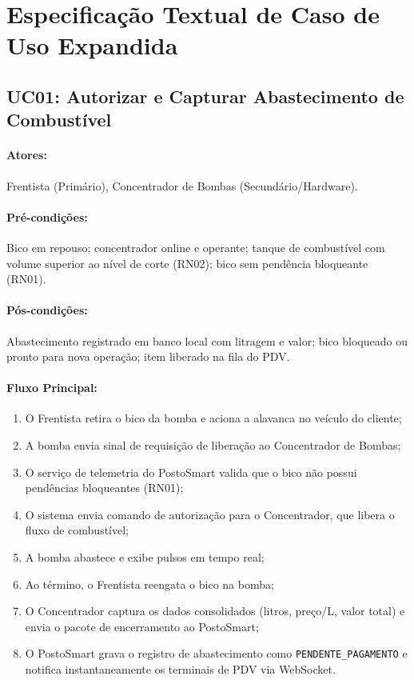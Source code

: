 \section{Especificação Textual de Caso de Uso Expandida}

\subsection{UC01: Autorizar e Capturar Abastecimento de Combustível}
\paragraph{Atores:} Frentista (Primário), Concentrador de Bombas (Secundário/Hardware).
\paragraph{Pré-condições:} Bico em repouso; concentrador online e operante; tanque de combustível com volume superior ao nível de corte (RN02); bico sem pendência bloqueante (RN01).
\paragraph{Pós-condições:} Abastecimento registrado em banco local com litragem e valor; bico bloqueado ou pronto para nova operação; item liberado na fila do PDV.

\paragraph{Fluxo Principal:}
\begin{enumerate}
    \item O Frentista retira o bico da bomba e aciona a alavanca no veículo do cliente;
    \item A bomba envia sinal de requisição de liberação ao Concentrador de Bombas;
    \item O serviço de telemetria do PostoSmart valida que o bico não possui pendências bloqueantes (RN01);
    \item O sistema envia comando de autorização para o Concentrador, que libera o fluxo de combustível;
    \item A bomba abastece e exibe pulsos em tempo real;
    \item Ao término, o Frentista reengata o bico na bomba;
    \item O Concentrador captura os dados consolidados (litros, preço/L, valor total) e envia o pacote de encerramento ao PostoSmart;
    \item O PostoSmart grava o registro de abastecimento como \texttt{PENDENTE\_PAGAMENTO} e notifica instantaneamente os terminais de PDV via WebSocket.
\end{enumerate}

